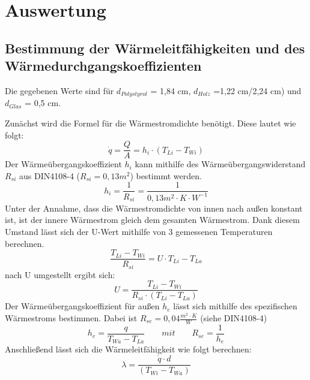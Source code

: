 \section{Auswertung}
\subsection{Bestimmung der Wärmeleitfähigkeiten und des Wärmedurchgangskoeffizienten}
Die gegebenen Werte sind für $d_{Polystyrol}$ = 1,84 cm, $d_{Holz}$ =1,22 cm/2,24 cm) und $d_{Glas}$ = 0,5 cm.

Zunächst wird die Formel für die Wärmestromdichte benötigt. Diese lautet wie folgt:
\begin{equation}
\dot q=\frac{ Q }{ A }=h_{ i }\cdot(T_{ Li }-T_{Wi})
  \label{eq:230514_Wärmestromdichte}
\end{equation}
Der Wärmeübergangskoeffizient $h_{i}$ kann mithilfe des Wärmeübergangswiderstand $R_{si}$ aus DIN4108-4 ($R_{si}=0,13 m^2$) bestimmt werden.
\begin{equation}
h_{i}=\frac{ 1 }{ R_{ si } }=\frac{ 1 }{ 0,13m^2\cdot K \cdot W^{-1} }
  \label{eq:230514_Wärmeübergangskoeffizient}
\end{equation}
Unter der Annahme, dass die Wärmestromdichte von innen nach außen konstant ist, ist der innere Wärmestrom gleich dem gesamten Wärmestrom. Dank diesem Umstand lässt sich der U-Wert mithilfe von 3 gemessenen Temperaturen berechnen.
\begin{equation}
\frac{ T_{Li} - T_{Wi}}{ R_{ si } }=U \cdot T_{Li} - T_{La}
  \label{eq:230514_u1}
\end{equation}
nach U umgestellt ergibt sich: 
\begin{equation}
U = \frac{ T_{Li} - T_{Wi}}{ R_{ si } \cdot  (T_{Li} - T_{La})}
  \label{eq:230514_u2}
\end{equation}
Der Wärmeübergangskoeffizient für außen $h_{e}$ lässt sich mithilfe des spezifischen Wärmestroms bestimmen. Dabei ist $R_{se}=0,04 \frac{ m^2 \cdot K }{W}$ (siehe DIN4108-4)
\begin{equation}
h_{e}=\frac{ q }{ T_{Wa} - T_{La} }   \qquad  mit     \qquad       R_{se}=\frac{ 1 }{ h_{e} }
  \label{eq:230514_h_e}
\end{equation}
Anschließend lässt sich die Wärmeleitfähigkeit wie folgt berechnen:
\begin{equation}
\lambda=\frac{ \dot q \cdot d }{  ( T_{Wi} - T_{Wa} )}
  \label{eq:230514_lamda}
\end{equation}


